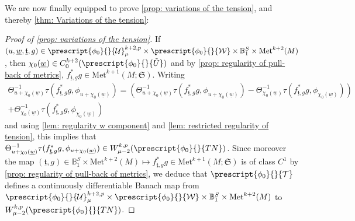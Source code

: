 \documentclass{article}
\numberwithin{equation}{section}        %
\theoremstyle{bfnote}
\theoremstyle{definition}
\theoremstyle{bfremark}
\newcommand{\Ball}{\mathbb{B}}              %
\newcommand{\Met}{\mathrm{Met}}             %
\begin{document}
We are now finally equipped to prove \cref{prop: variations of the tension}, and thereby \cref{thm: Variations of the tension}:

\begin{proof}[Proof of \cref{prop: variations of the tension}]
    If $(u,\underline{w},\underline{{\mathfrak{t}}},g) \in \prescript{\phi_0}{}{\mathcal{U}}^{k+2,p}_\mu \times \prescript{\phi_0}{}{\mathcal{W}} \times \Ball_1^S \times \Met^{k+2}(M)$, then $\chi_0(\underline{w}) \in C^{k+2}_0(\prescript{\phi_0}{}{\tilde{U}})$ and by \cref{prop: regularity of pull-back of metrics}, $f_{\underline{\mathfrak{t}},g}^*g \in \Met^{k+1}(M;\mathfrak{S})$. Writing 
    \begin{multline*}
        \Theta_{u+\chi_0(\underline{w})}^{-1} \tau(f_{\underline{\mathfrak{t}},g}^*g,\phi_{u+\chi_0(\underline{w})}) = (\Theta_{u+\chi_0(\underline{w})}^{-1} \tau(f_{\underline{\mathfrak{t}},g}^*g,\phi_{u+\chi_0(\underline{w})}) - \Theta_{\chi_0(\underline{w})}^{-1} \tau(f_{\underline{\mathfrak{t}},g}^*g,\phi_{\chi_0(\underline{w})})) \\ + \Theta_{\chi_0(\underline{w})}^{-1} \tau(f_{\underline{\mathfrak{t}},g}^*g,\phi_{\chi_0(\underline{w})})
    \end{multline*}
    and using \cref{lem: regularity w component} and \cref{lem: restricted regularity of tension}, this implies that $\Theta_{u+\chi_0(\underline{w})}^{-1} \tau(f_{\underline{\mathfrak{t}},g}^* g, \phi_{u+\chi_0(\underline{w})}) \in W^{k,p}_{\mu-2}(\prescript{\phi_0}{}{TN})$. Since moreover the map $(\underline{\mathfrak{t}},g) \in \Ball_1^S \times \Met^{k+2}(M) \mapsto f_{\underline{\mathfrak{t}},g}^*g \in \Met^{k+1}(M;\mathfrak{S})$ is of class $C^1$ by \cref{prop: regularity of pull-back of metrics}, we deduce that $\prescript{\phi_0}{}{\mathcal{T}}$ defines a continuously differentiable Banach map from $\prescript{\phi_0}{}{\mathcal{U}}^{k+2,p}_\mu \times \prescript{\phi_0}{}{\mathcal{W}} \times \Ball_1^S \times \Met^{k+2}(M)$ to $W^{k,p}_{\mu-2}(\prescript{\phi_0}{}{TN})$.
    

\end{proof}
\end{document}
